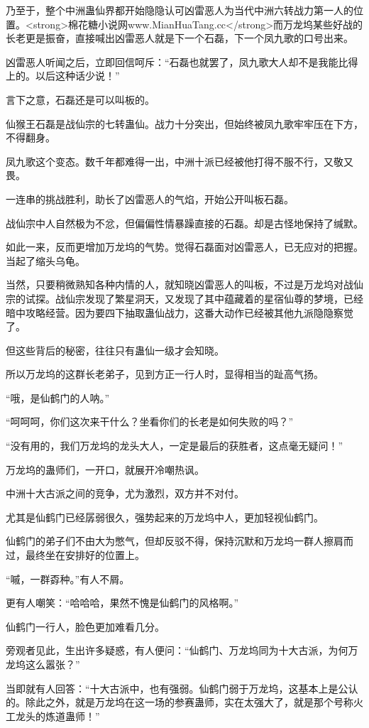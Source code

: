 \begin{this_body}
乃至于，整个中洲蛊仙界都开始隐隐认可凶雷恶人为当代中洲六转战力第一人的位置。<strong>棉花糖小说网www.MianHuaTang.cc</strong>而万龙坞某些好战的长老更是振奋，直接喊出凶雷恶人就是下一个石磊，下一个凤九歌的口号出来。

凶雷恶人听闻之后，立即回信呵斥：“石磊也就罢了，凤九歌大人却不是我能比得上的。以后这种话少说！”

言下之意，石磊还是可以叫板的。

仙猴王石磊是战仙宗的七转蛊仙。战力十分突出，但始终被凤九歌牢牢压在下方，不得翻身。

凤九歌这个变态。数千年都难得一出，中洲十派已经被他打得不服不行，又敬又畏。

一连串的挑战胜利，助长了凶雷恶人的气焰，开始公开叫板石磊。

战仙宗中人自然极为不忿，但偏偏性情暴躁直接的石磊。却是古怪地保持了缄默。

如此一来，反而更增加万龙坞的气势。觉得石磊面对凶雷恶人，已无应对的把握。当起了缩头乌龟。

当然，只要稍微熟知各种内情的人，就知晓凶雷恶人的叫板，不过是万龙坞对战仙宗的试探。战仙宗发现了繁星洞天，又发现了其中蕴藏着的星宿仙尊的梦境，已经暗中攻略经营。因为要四下抽取蛊仙战力，这番大动作已经被其他九派隐隐察觉了。

但这些背后的秘密，往往只有蛊仙一级才会知晓。

所以万龙坞的这群长老弟子，见到方正一行人时，显得相当的趾高气扬。

“哦，是仙鹤门的人呐。”

“呵呵呵，你们这次来干什么？坐看你们的长老是如何失败的吗？”

“没有用的，我们万龙坞的龙头大人，一定是最后的获胜者，这点毫无疑问！”

万龙坞的蛊师们，一开口，就展开冷嘲热讽。

中洲十大古派之间的竞争，尤为激烈，双方并不对付。

尤其是仙鹤门已经孱弱很久，强势起来的万龙坞中人，更加轻视仙鹤门。

仙鹤门的弟子们不由大为憋气，但却反驳不得，保持沉默和万龙坞一群人擦肩而过，最终坐在安排好的位置上。

“嘁，一群孬种。”有人不屑。

更有人嘲笑：“哈哈哈，果然不愧是仙鹤门的风格啊。”

仙鹤门一行人，脸色更加难看几分。

旁观者见此，生出许多疑惑，有人便问：“仙鹤门、万龙坞同为十大古派，为何万龙坞这么嚣张？”

当即就有人回答：“十大古派中，也有强弱。仙鹤门弱于万龙坞，这基本上是公认的。除此之外，就是万龙坞在这一场的参赛蛊师，实在太强大了，就是那个号称火工龙头的炼道蛊师！”


\end{this_body}
